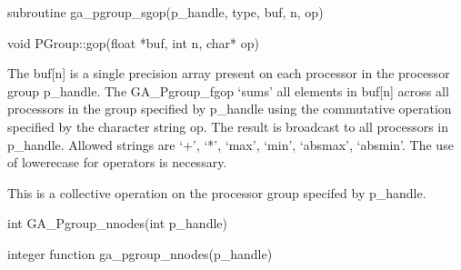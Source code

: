 \documentclass[12pt]{article}
\begin{document}
\begin{fapi}
\begin{fcode}
subroutine ga_pgroup_sgop(p_handle, type, buf, n, op)
\end{fcode}
\begin{funcargs}
\end{funcargs}
\end{fapi}

\begin{cxxapi}
\begin{cxxcode}
void PGroup::gop(float *buf, int n, char* op)
\end{cxxcode}
\begin{funcargs}
\end{funcargs}
\end{cxxapi}
\gcoll
\begin{desc}

The buf[n] is a single precision array present on each processor in the processor group p_handle. The GA_Pgroup_fgop `sums' all elements in buf[n] across all processors in the group specified by p_handle using the commutative operation specified by the character string op.  The result is broadcast to all processors in p_handle. Allowed strings are `+', `*', `max', `min', `absmax', `absmin'. The use of lowerecase for operators is necessary.

This is a collective operation on the processor group specifed by p_handle. 
\end{desc}


\begin{capi}
\begin{ccode}
int GA_Pgroup_nnodes(int p_handle)
\end{ccode}
\begin{funcargs}
\end{funcargs}
\end{capi}

\begin{fapi}
\begin{fcode}
integer function ga_pgroup_nnodes(p_handle)
\end{fcode}
\begin{funcargs}
\end{funcargs}
\end{fapi}
\end{document}
